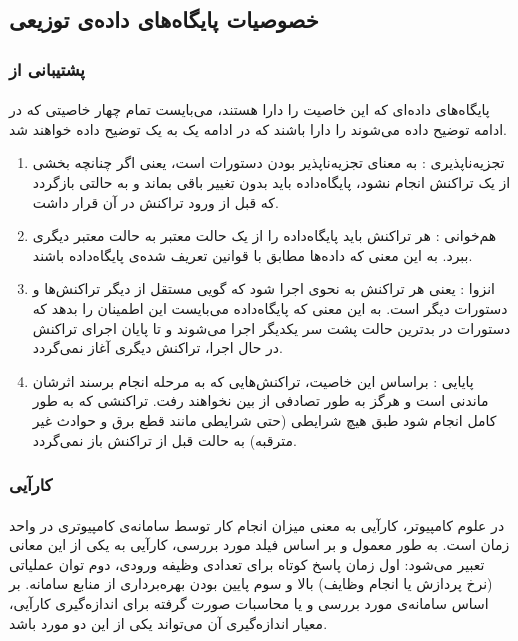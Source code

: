 \subsection{خصوصیات پایگاه‌های داده‌ی توزیعی} \label{subsection:database-features}

\subsubsection*{پشتیبانی از
}
\paragraph*{}
پایگاه‌های داده‌ای که این خاصیت را دارا هستند، می‌بایست تمام چهار خاصیتی که در ادامه توضیح داده می‌شوند را دارا باشند که در ادامه یک به یک توضیح داده خواهند شد.
\cite{garcia-2008}

\begin{enumerate}
\item {تجزیه‌ناپذیری }:
به معنای تجزیه‌ناپذیر بودن دستورات است، یعنی اگر چنانچه بخشی از یک تراکنش انجام نشود، پایگاه‌داده باید بدون تغییر باقی بماند و به حالتی بازگردد که قبل از ورود تراکنش در آن قرار داشت.

\item {هم‌خوانی }:
هر تراکنش باید پایگاه‌داده را از یک حالت معتبر به حالت معتبر دیگری ببرد. به این معنی که داده‌ها مطابق با قوانین تعریف شده‌ی پایگاه‌داده باشند.

\item {انزوا }:
یعنی هر تراکنش به نحوی اجرا شود که گویی مستقل از دیگر تراکنش‌ها و دستورات دیگر است. به این معنی که پایگاه‌داده می‌بایست این اطمینان را بدهد که دستورات در بدترین حالت پشت سر یکدیگر اجرا می‌شوند و تا پایان اجرای تراکنش در حال اجرا، تراکنش دیگری آغاز نمی‌گردد.

\item {پایایی }:
براساس این خاصیت، تراکنش‌هایی که به مرحله انجام برسند اثرشان ماندنی است و هرگز به طور تصادفی از بین نخواهند رفت. تراکنشی که به طور کامل انجام شود طبق هیچ شرایطی (حتی شرایطی مانند قطع برق و حوادث غیر مترقبه) به حالت قبل از تراکنش باز نمی‌گردد.
\end{enumerate}

\subsubsection*{کارآیی }
\paragraph*{}
در علوم کامپیوتر، کارآیی به معنی میزان انجام کار توسط سامانه‌ی کامپیوتری در واحد زمان است. به طور معمول و بر اساس فیلد مورد بررسی، کارآیی به یکی از این معانی تعبیر می‌شود: اول زمان پاسخ کوتاه برای تعدادی وظیفه
ورودی، دوم توان عملیاتی
(نرخ پردازش یا انجام وظایف) بالا و سوم پایین بودن بهره‌برداری
از منابع سامانه. بر اساس سامانه‌ی مورد بررسی و یا محاسبات صورت گرفته برای اندازه‌گیری کارآیی، معیار اندازه‌گیری آن می‌تواند یکی از این دو مورد باشد.

